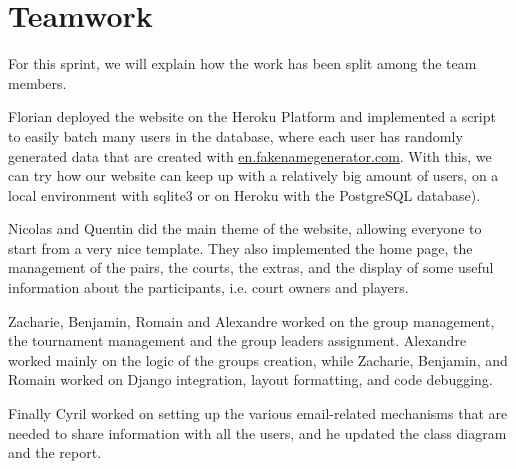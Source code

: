 \section{Teamwork}

For this sprint, we will explain how the work has been split among the team members. \newline

Florian deployed the website on the Heroku Platform and implemented a script to easily batch many users in the database, where each user has randomly generated data that are created
with \url{en.fakenamegenerator.com}. With this, we can try how our website can keep up with a relatively big amount of users, on a local environment with sqlite3 
or on Heroku with the PostgreSQL database). \newline

Nicolas and Quentin did the main theme of the website, allowing everyone to
start from a very nice template. They also implemented the home page, the management of the pairs, the
courts, the extras, and the display of some useful information about the
participants, i.e. court owners and players. \newline

Zacharie, Benjamin, Romain and Alexandre worked on the group management,
the tournament management and the group leaders assignment. Alexandre worked mainly on the logic of the groups creation, while Zacharie, Benjamin, and Romain worked on Django integration, layout formatting, and code debugging. \newline

Finally Cyril worked on setting up the various email-related mechanisms that are needed to share information with all the users, and he updated the class diagram and the report.